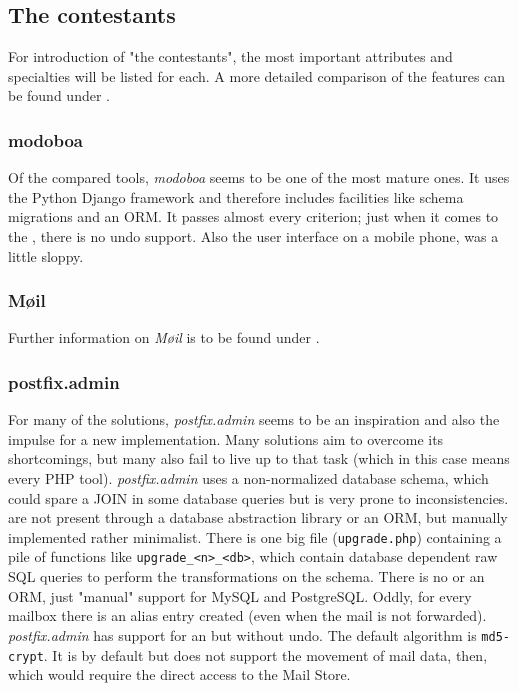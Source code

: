 \documentclass[12pt,a4paper]{scrartcl}
\begin{document}
		\subsection*{The contestants}
			For introduction of "the contestants", the most important
			attributes and specialties will be listed for each. A more detailed
			comparison of the features can be found under
			.

			\subsubsection*{modoboa}

				Of the compared tools, \emph{modoboa} seems to be one of the
				most mature ones. It uses the Python Django framework and
				therefore includes facilities like schema migrations and an
				\ac{ORM}. It passes almost every criterion; just when it comes
				to the , there is no undo support.
				Also the user interface on a mobile phone, was a little sloppy.

			\subsubsection*{Møil}
				
				Further information on \emph{Møil} is to be found under
				.

			\subsubsection*{postfix.admin}
			\label{sec:contestants:postfix.admin}

				For many of the solutions, \emph{postfix.admin} seems to be an
				inspiration and also the impulse for a new implementation. Many
				solutions aim to overcome its shortcomings, but many also fail
				to live up to that task (which in this case means every PHP
				tool). \emph{postfix.admin} uses a non-normalized \cite{dbnorm}
				database schema, which could spare a JOIN in some database
				queries but is very prone to inconsistencies.  are not present through a database abstraction
				library or an \ac{ORM}, but manually implemented rather
				minimalist. There is one big file (\texttt{upgrade.php})
				containing a pile of functions like
				\texttt{upgrade\_<n>\_<db>}, which contain database dependent
				raw \ac{SQL} queries to perform the transformations on the
				schema. There is no  or an \ac{ORM}, just "manual" support for
				MySQL and PostgreSQL. Oddly, for every mailbox there is an
				alias entry created (even when the mail is not forwarded).
				\emph{postfix.admin} has support for an  but without undo. The default  algorithm is \texttt{md5-crypt}. It is
				 by default but does not support the
				movement of mail data, then, which would require the direct
				access to the Mail Store.
\end{document}
